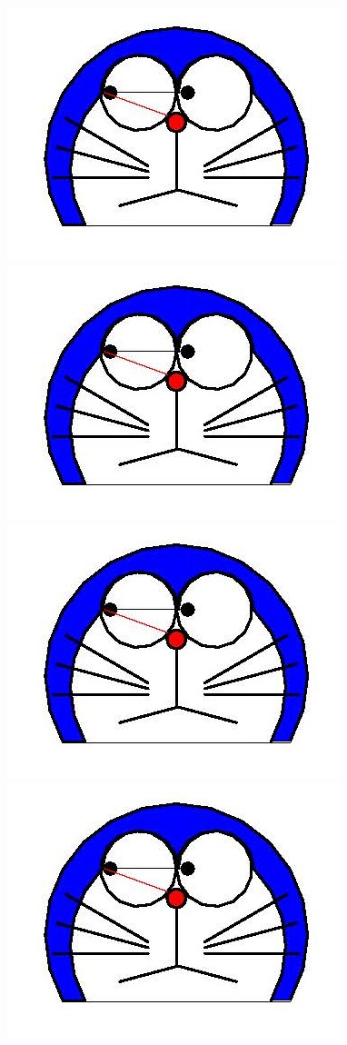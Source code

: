 \documentclass{article}
\begin{document}
\includegraphics[scale=.3, angle=90]{doraemon1.jpg}%
\includegraphics[scale=.3, angle=-90]{doraemon1.jpg}%
\includegraphics[scale=.3, angle=90, origin=c]{doraemon1.jpg}%
\includegraphics[scale=.3, angle=-90, origin=c]{doraemon1.jpg}%
\end{document}
